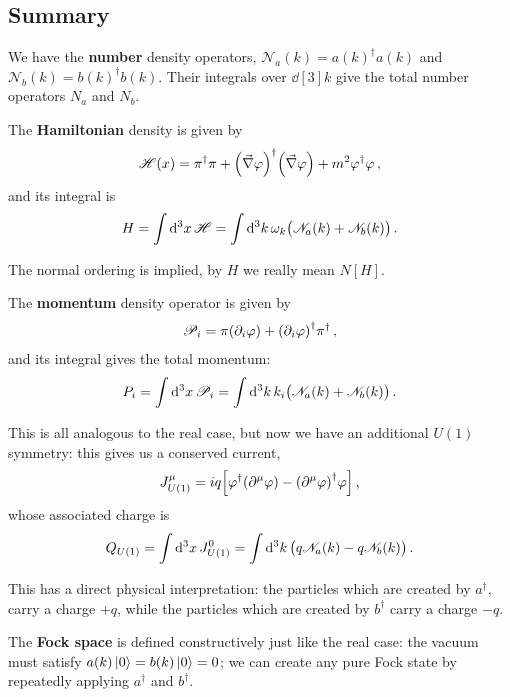 \documentclass[main.tex]{subfiles}
\begin{document}
\subsection{Summary}

We have the \textbf{number} density operators, \(\mathscr{N}_{a} (k) = a(k) ^\dag a(k)\) and \(\mathscr{N}_{b} (k) = b(k) ^\dag b(k)\). 
Their integrals over \(\dd[3]{k}\) give the total number operators \(N_a\) and \(N_b\). 

The \textbf{Hamiltonian} density is given by 
%
\begin{align}
\mathscr{H}(x) = \pi ^\dag \pi 
+ \qty(\vec{\nabla} \varphi ) ^\dag \qty(\vec{\nabla} \varphi )
+ m^2 \varphi ^\dag \varphi  
\,,
\end{align}
%
and its integral is 
%
\begin{align}
H = \int \dd[3]{x} \mathscr{H} = 
\int \dd[3]{k} \omega_{k} \qty(\mathscr{N}_a (k) + \mathscr{N}_b (k))
\,.
\end{align}

The normal ordering is implied, by \(H\) we really mean \(N[H]\).

The \textbf{momentum} density operator is given by 
%
\begin{align}
\mathscr{P}_{i} = \pi \qty(\partial_{i} \varphi )
+ \qty(\partial_{i} \varphi ) ^\dag \pi ^\dag
\,,
\end{align}
%
and its integral gives the total momentum: 
%
\begin{align}
P_i = \int \dd[3]{x} \mathscr{P}_{i} = \int \dd[3]{k} k_i \qty(\mathscr{N}_a (k) + \mathscr{N}_b (k))
\,.
\end{align}

This is all analogous to the real case, but now we have an additional \(U(1)\) symmetry: this gives us a conserved current, 
%
\begin{align}
J^{\mu }_{U(1)} = i q \qty[ \varphi ^\dag \qty(\partial^{\mu } \varphi )
- \qty(\partial^{\mu } \varphi )^\dag \varphi ] 
\,,
\end{align}
%
whose associated charge is 
%
\begin{align}
Q_{U(1)} = \int \dd[3]{x} J^{0}_{U(1)}
= \int \dd[3]{k} \qty(q \mathscr{N}_a (k) - q \mathscr{N}_b(k))
\,.
\end{align}

This has a direct physical interpretation: the particles which are created by \(a ^\dag\), carry a charge \(+q\), while the particles which are created by \(b ^\dag\) carry a charge \(-q\). 

The \textbf{Fock space} is defined constructively just like the real case: the vacuum must satisfy \(a (k) \ket{0} = b(k) \ket{0} = 0\); we can create any pure Fock state by repeatedly applying \(a ^\dag\) and \(b ^\dag\). 
\end{document}
